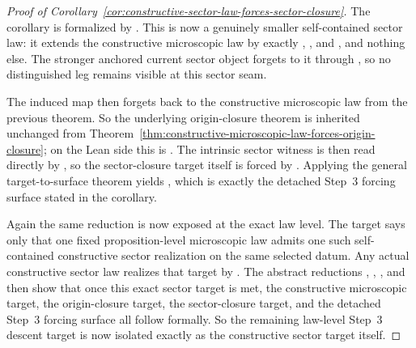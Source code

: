 \begin{proof}[Proof of Corollary~\ref{cor:constructive-sector-law-forces-sector-closure}]
\label{proof:cor:constructive-sector-law-forces-sector-closure}
The corollary is formalized by .
This is now a genuinely smaller self-contained sector law: it extends the
constructive microscopic law by exactly
,
, and
, and nothing else. The stronger
anchored current sector object forgets to it through
, so
no distinguished leg remains visible at this sector seam.

The induced map
 then
forgets back to the constructive microscopic law from the previous theorem. So
the underlying origin-closure theorem is inherited unchanged from
Theorem~\ref{thm:constructive-microscopic-law-forces-origin-closure}; on the
Lean side this is
. The intrinsic
sector witness is then read directly by
, so the
sector-closure target itself is forced by
. Applying the
general target-to-surface theorem yields
, which is
exactly the detached Step~3 forcing surface stated in the corollary.

Again the same reduction is now exposed at the exact law level. The target
 says only that one fixed
proposition-level microscopic law admits one such self-contained constructive
sector realization on the same selected datum. Any actual constructive sector
law realizes that target by .
The abstract reductions
,
,
,
and
then show that once this exact sector target is met, the constructive
microscopic target, the origin-closure target, the sector-closure target, and
the detached Step~3 forcing surface all follow formally. So the remaining
law-level Step~3 descent target is now isolated exactly as the constructive
sector target itself.
\end{proof}

